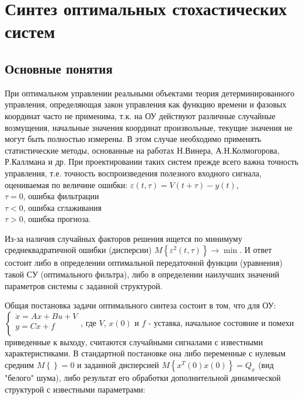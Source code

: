 \documentclass[preprint,russian,a5paper,10pt,twoside,mediummath]{ncc}
\begin{document}
\clearpage
\section{Синтез оптимальных стохастических систем\label{stochastic}}
	\subsection{Основные понятия\label{stochastic:general}}
\par При оптимальном управлении реальными объектами теория детерминированного управления, определяющая закон управления как функцию времени и фазовых координат часто не применима, т.к. на ОУ действуют различные случайные возмущения, начальные значения координат произвольные, текущие значения не могут быть полностью измерены. В этом случае необходимо применять статистические методы, основанные на работах Н.Винера, А.Н.Колмогорова, Р.Каллмана и др. При проектировании таких систем прежде всего важна точность управления, т.е. точность воспроизведения полезного входного сигнала, оцениваемая по величине ошибки: $\varepsilon \left( t,\tau  \right)=V\left( t+\tau  \right)-y\left( t \right)$, 
\\$\tau =0$, ошибка фильтрации
\\$\tau <0$, ошибка сглаживания
\\$\tau >0$, ошибка прогноза.
\par Из-за наличия случайных факторов решения ищется по минимуму среднеквадратичной ошибки (дисперсии)   $M\left\{ {{\varepsilon }^{2}}\left( t,\tau  \right) \right\}\to \min $. И ответ состоит либо в определении оптимальной передаточной функции (уравнения) такой СУ (оптимального фильтра), либо в определении наилучших значений параметров системы с заданной структурой. 
\par Общая постановка задачи оптимального синтеза состоит в том, что для ОУ: 
$\left\{ \begin{array}{*{35}{l}}
   \dot{x}=Ax+Bu+V  \\
   y=Cx+f  \\
\end{array} \right.$, где $V$, $x\left( 0 \right)$ и $f$ - уставка, начальное состояние и помехи приведенные к выходу, считаются случайными сигналами с известными характеристиками. В стандартной постановке она либо переменные с нулевым средним $M\left\{ {} \right\}=0$ и заданной дисперсией 
$M\left\{ {{x}^{T}}\left( 0 \right)x\left( 0 \right) \right\}={{Q}_{x}}$ (вид "белого" шума), либо результат его обработки дополнительной динамической структурой с известными параметрами:
\end{document}
